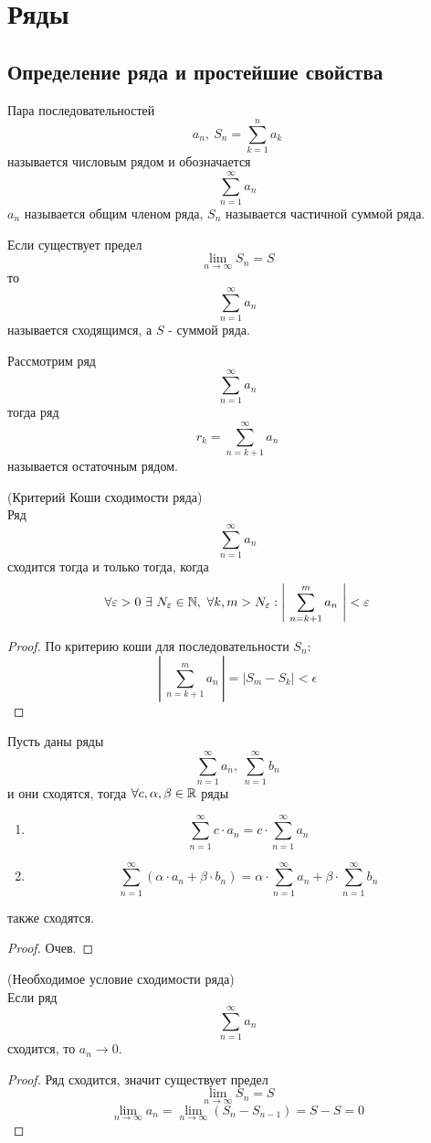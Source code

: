 \section{Ряды}
\subsection{Определение ряда и простейшие свойства}
\begin{definition}
    Пара последовательностей
    \[a_n,\ S_n=\sum_{k=1}^{n}a_k\]
    называется числовым рядом и обозначается
    \[\sum_{n=1}^{\infty}a_n\]
    $a_n$ называется общим членом ряда, $S_n$ называется частичной суммой ряда.
\end{definition}
\begin{definition}
    Если существует предел
    \[\lim\limits_{n\to \infty}S_n=S\]
    то 
    \[\sum_{n=1}^{\infty}a_n\]
    называется сходящимся, а $S$ - суммой ряда.
\end{definition}
\begin{definition}
    Рассмотрим ряд
    \[\sum_{n=1}^{\infty}a_n\]
    тогда ряд 
    \[r_k=\sum_{n=k+1}^{\infty}a_n\]
    называется остаточным рядом.
\end{definition}
\begin{theorem}(Критерий Коши сходимости ряда)\\
    Ряд
    \[\sum_{n=1}^{\infty}a_n\]
    сходится тогда и только тогда, когда
    \[\forall \epsilon>0\ \exists\ N_{\epsilon}\in \N,\ \forall k,m>N_{\epsilon}: \left|\ \sum_{n=k+1}^{m}a_n\ \right|<\epsilon\]
\end{theorem}
\begin{proof}
    По критерию коши для последовательности $S_n$:
    \[\left|\ \sum_{n=k+1}^{m}a_n\ \right|=|S_m-S_{k}|<\epsilon\]
\end{proof}
\begin{theorem}
    Пусть даны ряды
    \[\sum_{n=1}^{\infty}a_n,\ \sum_{n=1}^{\infty}b_n\]
    и они сходятся, тогда $\forall c, \alpha, \beta\in \mathbb{R}$ ряды
    \begin{enumerate}
        \item
        \[\sum_{n=1}^{\infty}c\cdot a_n=c\cdot \sum_{n=1}^{\infty}a_n\]
        \item 
        \[\sum_{n=1}^{\infty}(\alpha\cdot a_n+\beta\cdot b_n)=\alpha\cdot \sum_{n=1}^{\infty}a_n+\beta\cdot \sum_{n=1}^{\infty}b_n\]
    \end{enumerate}
    также сходятся.
\end{theorem}
\begin{proof}
    Очев.
\end{proof}
\begin{theorem} (Необходимое условие сходимости ряда)\\
    Если ряд
    \[\sum_{n=1}^{\infty}a_n\]
    сходится, то $a_n\to 0$.
\end{theorem}
\begin{proof}
    Ряд сходится, значит существует предел
    \[\lim\limits_{n\to\infty}S_n=S\]
    \[\lim\limits_{n\to\infty}a_n=\lim\limits_{n\to\infty}(S_n-S_{n-1})=S-S=0\]
\end{proof}

